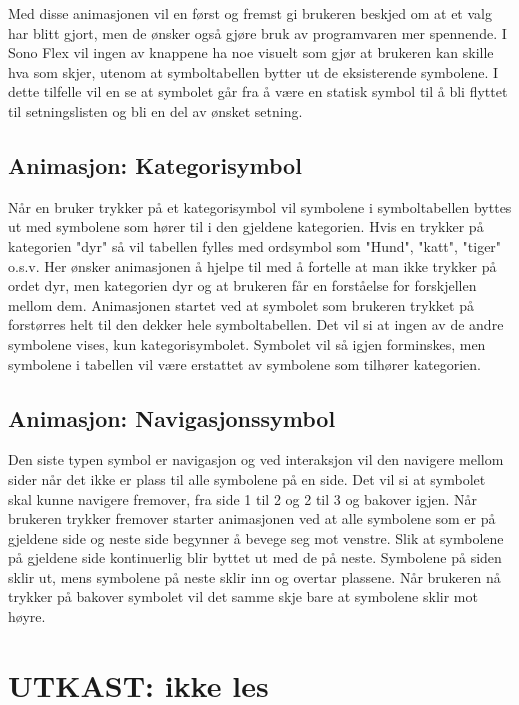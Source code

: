 \documentclass[phd,tocprelim]{cornell}
\begin{document}
    Med disse animasjonen vil en først og fremst gi brukeren beskjed om at et valg har blitt gjort, men de ønsker også gjøre bruk av programvaren mer spennende.  I Sono Flex  vil ingen av knappene ha noe visuelt som gjør at brukeren kan skille hva som skjer, utenom at symboltabellen bytter ut de eksisterende symbolene. I dette tilfelle vil en se at symbolet går fra å være en statisk symbol til å bli flyttet til setningslisten og bli en del av ønsket setning. 



\subsection{Animasjon: Kategorisymbol}

Når en bruker trykker på et kategorisymbol vil symbolene i symboltabellen byttes ut med symbolene som hører til i den gjeldene kategorien. Hvis en trykker på kategorien "dyr" så vil tabellen fylles med ordsymbol som "Hund", "katt", "tiger" o.s.v. Her ønsker animasjonen å hjelpe til med å fortelle at man ikke trykker på ordet dyr, men kategorien dyr og at brukeren får en forståelse for forskjellen mellom dem. Animasjonen startet ved at symbolet som brukeren trykket på forstørres helt til den dekker hele symboltabellen. Det vil si at ingen av de andre symbolene vises, kun kategorisymbolet. Symbolet vil så igjen forminskes, men symbolene i tabellen vil være erstattet av symbolene som tilhører kategorien. 


\subsection{Animasjon: Navigasjonssymbol}


Den siste typen symbol er navigasjon og ved interaksjon vil den navigere mellom sider når det ikke er plass til alle symbolene på en side. Det vil si at symbolet skal kunne navigere fremover, fra side 1 til 2 og 2 til 3 og bakover igjen. Når brukeren trykker fremover starter animasjonen ved at alle symbolene som er på gjeldene side og neste side begynner å bevege seg mot venstre. Slik at symbolene på gjeldene side kontinuerlig blir byttet ut med de på neste. Symbolene på siden sklir ut, mens symbolene på neste sklir inn og overtar plassene. Når brukeren nå trykker på bakover symbolet vil det samme skje bare at symbolene sklir mot høyre.




\section{UTKAST: ikke les}
\end{document}
